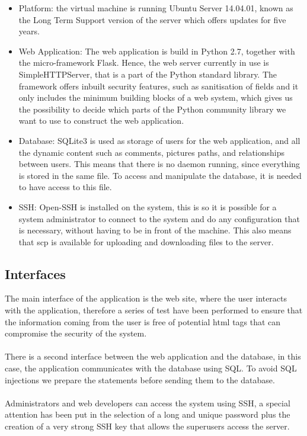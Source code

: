 \documentclass{article}
\begin{document}
\begin{itemize}
\item Platform: the virtual machine is running Ubuntu Server 14.04.01, known as the Long Term Support version of the server which offers updates for five years. 


\item Web Application: The web application is build in Python 2.7, together with the micro-framework Flask. Hence, the web server currently in use is  SimpleHTTPServer, that is a part of the Python standard library. The framework offers inbuilt security features, such as sanitisation of fields and it only includes the minimum building blocks of a web system, which gives us the possibility to decide which parts of the Python community library we want to use to construct the web application.  

\item Database: SQLite3 is used as storage of users for the web application, and all the dynamic content such as comments, pictures paths, and relationships between users. This means that there is no daemon running, since everything is stored in the same file. To access and manipulate the database, it is needed to have access to this file. 
\end{itemize}
\begin{itemize}



\item SSH: Open-SSH is installed on the system, this is so it is possible for a system administrator to connect to the system and do any configuration that is necessary, without having to be in front of the machine. This also means that scp is available for uploading and downloading files to the server. 
\end{itemize}

\subsection{Interfaces}
The main interface of the application is the web site, where the user interacts with the application, therefore a series of test have been performed to ensure that the information coming from the user is free of potential html tags that can compromise the security of the system.\\ \\
There is a second interface between the web application and the database, 
in this case, the application communicates with the database using SQL. To avoid SQL injections we prepare the statements before sending them to the database.\\ \\
Administrators and web developers can access the system using SSH, a special attention has been put in the selection of a long and unique password plus the creation of a very strong SSH key that allows the superusers access the server.
\end{document}
